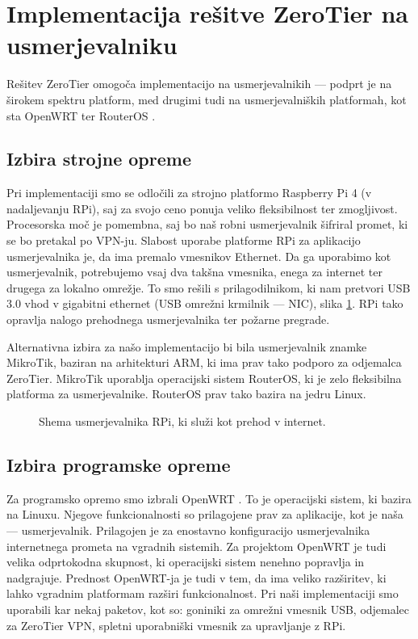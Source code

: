 \documentclass[a4paper, 12pt]{book}
\begin{document}
\section{Implementacija rešitve ZeroTier na usmerjevalniku}
\label{implementacija_usmerjevalnika}
Rešitev ZeroTier omogoča implementacijo na usmerjevalnikih --- podprt je na širokem spektru platform, med drugimi tudi na usmerjevalniških platformah, kot  sta OpenWRT \cite{brown_welcome_2016} ter RouterOS \cite{noauthor_mikrotik_nodate}. %

\subsection{Izbira strojne opreme}

Pri implementaciji smo se odločili za strojno platformo Raspberry Pi 4 (v nadaljevanju RPi), saj za svojo ceno ponuja veliko fleksibilnost ter zmogljivost. Procesorska moč je pomembna, saj bo naš robni usmerjevalnik šifriral promet, ki se bo pretakal po VPN-ju. Slabost uporabe platforme RPi za aplikacijo usmerjevalnika je, da ima premalo vmesnikov Ethernet. Da ga uporabimo kot usmerjevalnik, potrebujemo vsaj dva takšna vmesnika, enega za internet ter drugega za lokalno omrežje. To smo rešili s prilagodilnikom, ki nam pretvori USB 3.0 vhod v gigabitni ethernet (USB omrežni krmilnik --- NIC), slika \ref{robni_usmerjevalnik}. RPi tako opravlja nalogo prehodnega usmerjevalnika ter požarne pregrade.

Alternativna izbira za našo implementacijo bi bila usmerjevalnik znamke MikroTik, baziran na arhitekturi ARM, ki ima prav tako podporo za odjemalca ZeroTier. MikroTik uporablja operacijski sistem RouterOS, ki je zelo fleksibilna platforma za usmerjevalnike. RouterOS prav tako bazira na jedru Linux.

\begin{figure}[h]
\begin{center}

\end{center}
\caption{Shema usmerjevalnika RPi, ki služi kot prehod v internet. \cite{rvidmar}}
\label{robni_usmerjevalnik}
\end{figure}

\subsection{Izbira programske opreme}
Za programsko opremo smo izbrali OpenWRT \cite{brown_welcome_2016}. To je operacijski sistem, ki bazira na Linuxu. Njegove funkcionalnosti so prilagojene prav za aplikacije, kot je naša --- usmerjevalnik. Prilagojen je za enostavno konfiguracijo usmerjevalnika internetnega prometa na vgradnih sistemih. Za projektom OpenWRT je tudi velika odprtokodna skupnost, ki operacijski sistem nenehno popravlja in nadgrajuje. Prednost OpenWRT-ja je tudi v tem, da ima veliko razširitev, ki lahko vgradnim platformam razširi funkcionalnost. Pri naši implementaciji smo uporabili kar nekaj paketov, kot so: goniniki za omrežni vmesnik USB, odjemalec za ZeroTier VPN, spletni uporabniški vmesnik za upravljanje z RPi.
\end{document}
